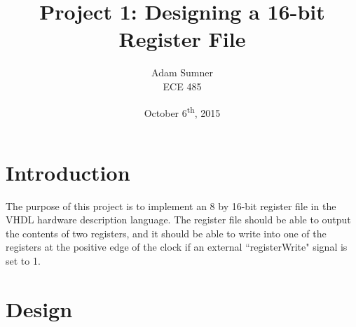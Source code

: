\documentclass[12pt]{article}
\title{Project 1: Designing a 16-bit Register File}
\author{Adam Sumner \\ ECE 485}
\date{October 6\textsuperscript{th}, 2015}
\begin{document}
\maketitle

\section{Introduction}
The purpose of this project is to implement an 8 by 16-bit register file in the VHDL hardware description language. The register file should be able to output the contents of two registers, and it should be able to write into one of the registers at the positive edge of the clock if an external ``registerWrite" signal is set to 1.
\section{Design}
\end{document}
